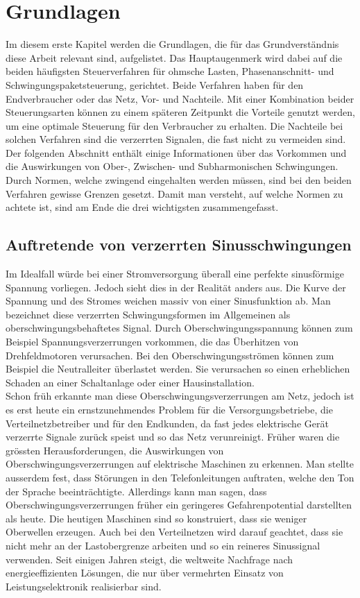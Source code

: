 

\section{Grundlagen}
Im diesem erste Kapitel werden die Grundlagen, die für das Grundverständnis diese Arbeit relevant sind, aufgelistet. Das Hauptaugenmerk wird dabei auf die beiden häufigsten Steuerverfahren für ohmsche Lasten, Phasenanschnitt- und Schwingungspaketsteuerung, gerichtet. Beide Verfahren haben für den Endverbraucher oder das Netz, Vor- und Nachteile. Mit einer Kombination beider Steuerungsarten können zu einem späteren Zeitpunkt die Vorteile genutzt werden, um eine optimale Steuerung für den Verbraucher zu erhalten. Die Nachteile bei solchen Verfahren sind die verzerrten Signalen, die fast nicht zu vermeiden sind. Der folgenden Abschnitt enthält einige Informationen über das Vorkommen und die Auswirkungen von Ober-, Zwischen- und Subharmonischen Schwingungen. Durch Normen, welche zwingend eingehalten werden müssen, sind bei den beiden Verfahren gewisse Grenzen gesetzt. Damit man versteht, auf welche Normen zu achtete ist, sind am Ende die drei wichtigsten zusammengefasst.      





\subsection{Auftretende von verzerrten Sinusschwingungen}
Im Idealfall würde bei einer Stromversorgung überall eine perfekte sinusförmige Spannung vorliegen. Jedoch sieht dies in der Realität anders aus. Die Kurve der Spannung und des Stromes weichen massiv von einer Sinusfunktion ab. Man bezeichnet diese verzerrten Schwingungsformen im Allgemeinen als oberschwingungsbehaftetes Signal. Durch Oberschwingungsspannung können zum Beispiel Spannungsverzerrungen vorkommen, die das Überhitzen von Drehfeldmotoren verursachen. Bei den Oberschwingungsströmen können zum Beispiel die Neutralleiter überlastet werden. Sie verursachen so einen erheblichen Schaden an einer Schaltanlage oder einer Hausinstallation.\\
Schon früh erkannte man diese Oberschwingungsverzerrungen am Netz, jedoch ist es erst heute ein ernstzunehmendes Problem für die Versorgungsbetriebe, die Verteilnetzbetreiber und für den Endkunden, da fast jedes elektrische Gerät verzerrte Signale zurück speist und so das Netz verunreinigt. Früher waren die grössten Herausforderungen, die Auswirkungen von Oberschwingungsverzerrungen auf elektrische Maschinen zu erkennen. Man stellte ausserdem fest, dass Störungen in den Telefonleitungen auftraten, welche den Ton der Sprache beeinträchtigte. Allerdings kann man sagen, dass Oberschwingungsverzerrungen früher ein geringeres Gefahrenpotential darstellten als heute. Die heutigen Maschinen sind so konstruiert, dass sie weniger Oberwellen erzeugen. Auch  bei den Verteilnetzen wird darauf geachtet, dass sie nicht mehr an der Lastobergrenze arbeiten und so ein reineres Sinussignal verwenden. Seit einigen Jahren steigt, die weltweite Nachfrage nach energieeffizienten Lösungen, die nur über vermehrten Einsatz von Leistungselektronik realisierbar sind. 


